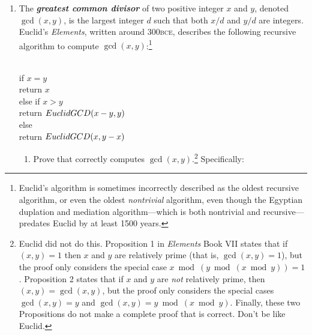 \begin{exercises}
\begin{enumerate}[label=\arabic*.,ref=\thechapter.\arabic*,leftmargin=*,align=left,itemsep=1.5ex plus 0.5ex,resume]
\begin{enumerate}
\noindent What is the running time of $(n, n)$ if we use grade-school multiplication? 
\item Describe and analyze a variant of Karatsuba’s algorithm that multiplies any $k$-digit number and any $l$-digit number, for any $k \ge l$, in $O(k \cdot l^{\lg 3 - 1}) = O(k \cdot l^{0.585})$ time.
\item {} What are the running times of $(n)$ and $(n, n)$ if we use the modified Karatsuba multiplication from part (e)?
\end{enumerate}
\item The \textbf{\textit{greatest common divisor}} of two positive integer $x$ and $y$, denoted $\gcd(x , y)$, is the largest integer $d$ such that both $x/d$ and $y/d$ are integers. Euclid’s \emph{Elements}, written around 300\textsc{bce}, describes the following recursive algorithm to compute $\gcd(x, y)$:\footnote{Euclid’s algorithm is sometimes incorrectly described as the oldest recursive algorithm, or even the oldest \emph{nontrivial} algorithm, even though the Egyptian duplation and mediation algorithm—which is both nontrivial and recursive—predates Euclid by at least 1500 years.}
\begin{pseudocode}
\\
if $x = y$\\
\Indent return $x$\\
else if $x > y$\\
\Indent return $EuclidGCD(x-y, y)$\\
else\\
\Indent return $EuclidGCD(x, y-x)$
\end{pseudocode}
\begin{enumerate}
\item Prove that  correctly computes $\gcd(x, y)$.\footnote{Euclid did not do this. Proposition 1 in \emph{Elements} Book VII states that if $(x, y) = 1$ then $x$ and $y$ are relatively prime (that is, $\gcd(x, y) = 1$), but the proof only considers the special case $x \bmod(y \bmod(x \bmod y)) = 1$. Proposition 2 states that if $x$ and $y$ are \emph{not} relatively prime, then $(x, y) = \gcd(x, y)$, but the proof only considers the special cases $\gcd(x, y) = y$ and $\gcd(x, y) = y \bmod(x \bmod y)$. Finally, these two Propositions do not make a complete proof that  is correct. Don’t be like Euclid.} Specifically:

\end{enumerate}
\end{enumerate}
\end{exercises}
